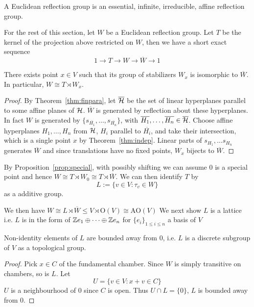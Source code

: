 \documentclass[../main.tex]{subfiles}
\begin{document}
\begin{definition}
    A Euclidean reflection group is an essential, infinite, irreducible, affine reflection group.
\end{definition}

For the rest of this section, let $W$ be a Euclidean reflection group. Let $T$ be the kernel of the projection above restricted on $W$, then we have a short exact sequence \[
1\rightarrow T\rightarrow W \rightarrow\overline W \rightarrow 1
\]

\begin{proposition}\label{prop:special}
    There exists point $x\in V$ such that its group of stabilizers $W_x$ is isomorphic to $\overline W$. In particular, $W\cong T\rtimes W_x$.
\end{proposition}

\begin{proof}
    By Theorem~\ref{thm:finpara}, let $\overline {\mathcal{H}}$ be the set of linear hyperplanes parallel to some affine planes of $\mathcal{H}$. $\overline W$ is generated by reflection about these hyperplanes. In fact $W$ is generated by $\{s_{\overline{H_1}},\dots,s_{\overline{H_n}}\}$, with $\overline{H_1},\dots,\overline{H_n} \in \overline {\mathcal{H}}$. Choose affine hyperplanes $H_1,\dots,H_n$ from $\mathcal{H}$, $H_i$ parallel to $\overline{H_i}$, and take their intersection, which is a single point $x$ by Theorem~\ref{thm:indep}. Linear parts of $s_{H_1},\dots s_{H_n}$ generates $\overline W$ and since translations have no fixed points, $W_x$ bijects to $\overline W$.
\end{proof}

By Proposition~\ref{prop:special}, with possibly shifting we can assume $0$ is a special point and hence $W\cong T\rtimes W_0\cong T \rtimes \overline W$. We can then identify $T$ by \[
L := \{v \in V : \tau_v \in W\}
\]
as a additive group. 

We then have $W\cong L\rtimes \overline W\leq V \rtimes \text{O}(V)\cong \text{AO}(V)$
We next show $L$ is a lattice i.e.   $L$ is in the form of $\mathbb{Z} e_1\oplus \dots \oplus \mathbb{Z} e_n$ for $\{e_i\}_{1\leq i\leq n}$ a basis of $V$


\begin{lemma}
    Non-identity elements of $L$ are bounded away from $0$, i.e. $L$ is a discrete subgroup of $V$ as a topological group. 
\end{lemma}

\begin{proof}
    Pick $x\in C$ of the fundamental chamber. Since $W$ is simply transitive on chambers, so is $L$. Let \[U=\{v\in V:x+v \in C\}\]
    $U$ is a neighbourhood of $0$ since $C$ is open. Thus $U\cap L=\{0\}$, $L$ is bounded away from $0$.
\end{proof}
\end{document}
